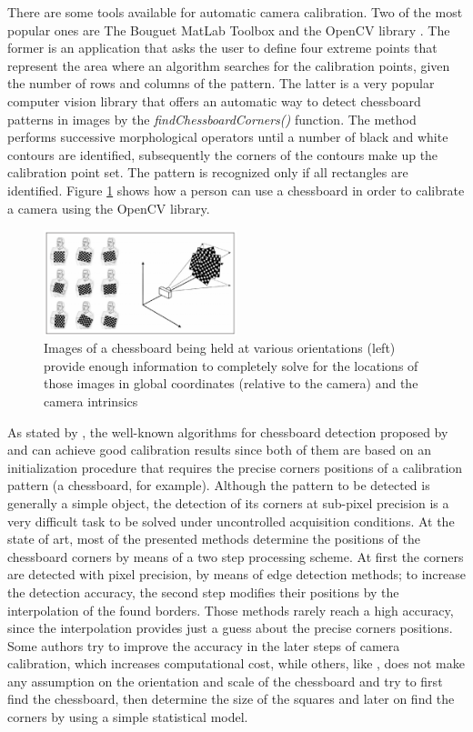 \documentclass[msc, a4paper, classic, en]{ufbathesis}
\begin{document}
There are some tools available for automatic camera calibration. Two of the most popular ones are The Bouguet MatLab Toolbox \cite{matlab} and the OpenCV library \cite{opencv}. The former is an application that asks the user to define four extreme points that represent the area where an algorithm searches for the calibration points, given the number of rows and columns of the pattern. The latter is a very popular computer vision library that offers an automatic way to detect chessboard patterns in images by the \textit{findChessboardCorners()} function. The method performs successive morphological operators until a number of black and white contours are identified, subsequently the corners of the contours make up the calibration point set. The pattern is recognized only if all rectangles are identified. Figure \ref{fig:chessboard} shows how a person can use a chessboard in order to calibrate a camera using the OpenCV library.

\begin{figure}
\label{fig:chessboard}
\centering
\includegraphics[width=0.5\textwidth]{images/chessboard.png}
\caption{Images of a chessboard being held at various orientations (left) provide enough information to completely solve for the locations of those images in global coordinates (relative to the
camera) and the camera intrinsics \cite{bradski2008learning}}
\end{figure}

As stated by \cite{arca}, the well-known algorithms for chessboard detection proposed by \cite{Tsai86} and \cite{zhang2000flexible} can achieve good calibration results since both of them are based on an initialization procedure that requires the precise corners positions of a calibration pattern (a chessboard, for example). Although the pattern to be detected is generally a simple object, the detection of its corners at sub-pixel precision is a very difficult task to be solved under uncontrolled acquisition conditions. At the state of art, most of the presented methods determine the positions of the chessboard corners by means of a two step processing scheme. At first the corners are detected with pixel precision, by means of edge detection methods; to increase the detection accuracy, the second step modifies their positions by the interpolation of the found borders. Those methods rarely reach a high accuracy, since the interpolation provides just a guess about the precise corners positions. Some authors try to improve the accuracy in the later steps of camera calibration, which increases computational cost, while others, like \cite{arca}, does not make any assumption on the orientation and scale of the chessboard and try to first find the chessboard, then determine the size of the squares and later on find the corners by using a simple statistical model.
\end{document}
